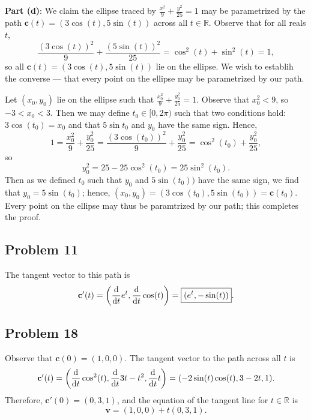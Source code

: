 \documentclass[11pt]{article}
\renewcommand{\vec}[1]{\mathbf{#1}}
\begin{document}
\textbf{Part (d)}: We claim the ellipse traced by $\tfrac{x^{2}}{9} + \tfrac{y^{2}}{25} = 1$ may be parametrized by the path $\vec{c}(t) = (3 \cos(t), 5 \sin(t))$ across all $t \in \mathbb{R}$. Observe that for all reals $t$,
\[
	\frac{(3 \cos(t))^{2}}{9} + \frac{(5 \sin(t))^{2}}{25} = \cos^{2} (t) + \sin^{2} (t) = 1,
\]
so all $\boxed{\vec{c}(t) = (3 \cos(t), 5 \sin(t))}$ lie on the ellipse. We wish to establih the converse --- that every point on the ellipse may be parametrized by our path.

Let $(x_{0}, y_{0})$ lie on the ellipse such that $\tfrac{x_{0}^{2}}{9} + \tfrac{y_{0}^{2}}{25} = 1$. Observe that $x_{0}^{2} < 9$, so $-3 < x_{0} < 3$. Then we may define $t_{0} \in [0, 2\pi)$ such that two conditions hold: $3 \cos(t_{0}) = x_{0}$ and that $5 \sin{t_{0}}$ and $y_{0}$ have the same sign. Hence,
\[
	1 = \frac{x_{0}^{2}}{9} + \frac{y_{0}^{2}}{25} = \frac{(3\cos(t_{0}))^{2}}{9} + \frac{y_{0}^{2}}{25} = \cos^{2}(t_{0}) + \frac{y_{0}^{2}}{25},
\]
so
\[
	y_{0}^{2} = 25 - 25 \cos^{2} (t_{0}) = 25\sin^{2} (t_{0}).
\]
Then as we defined $t_{0}$ such that $y_{0}$ and $5\sin(t_{0}))$ have the same sign, we find that $y_{0} = 5 \sin(t_{0})$; hence, $(x_{0}, y_{0}) = (3 \cos(t_{0}), 5 \sin(t_{0})) = \vec{c}(t_{0})$. Every point on the ellipse may thus be paramtrized by our path; this completes the proof.


\subsection{Problem 11}

The tangent vector to this path is
\[
	\vec{c}'(t) = \left( \dv{t} e^{t}, \dv{t} \cos(t) \right) = \boxed{(e^{t}, -\sin(t))}.
\]


\subsection{Problem 18}

Observe that $\vec{c}(0) = (1, 0, 0)$. The tangent vector to the path across all $t$ is 
\[
	\vec{c}'(t) = \left( \dv{t} \cos^{2}(t), \dv{t} 3t - t^{2}, \dv{t} t \right) = (- 2 \sin(t) \cos(t), 3 - 2t, 1).
\]
Therefore, $\vec{c}'(0) = (0, 3, 1)$, and the equation of the tangent line for $t \in \mathbb{R}$ is 
\[
	\boxed{\vec{v} = (1, 0, 0) + t(0, 3, 1)}.
\]
\end{document}
